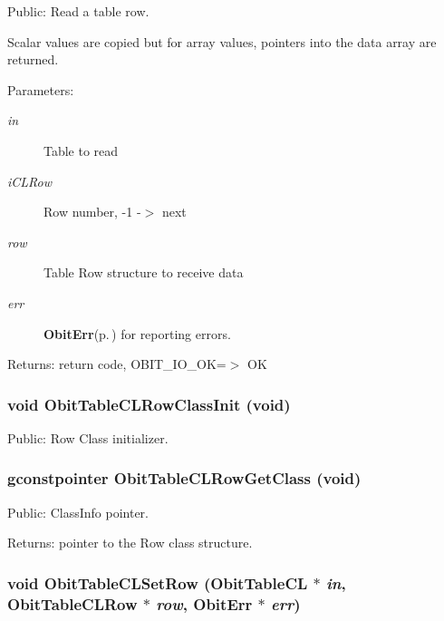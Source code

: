 Public: Read a table row. 

Scalar values are copied but for array values, pointers into the data array are returned. \begin{Desc}
\item[Parameters:]
\begin{description}
\item[{\em in}]Table to read \item[{\em i\-CLRow}]Row number, -1 -$>$ next \item[{\em row}]Table Row structure to receive data \item[{\em err}]{\bf Obit\-Err}{\rm (p.\,\pageref{structObitErr})} for reporting errors. \end{description}
\end{Desc}
\begin{Desc}
\item[Returns:]return code, OBIT\_\-IO\_\-OK=$>$ OK \end{Desc}
\subsubsection{\setlength{\rightskip}{0pt plus 5cm}void Obit\-Table\-CLRow\-Class\-Init (void)}\label{ObitTableCL_8h_a7}


Public: Row Class initializer. 

\subsubsection{\setlength{\rightskip}{0pt plus 5cm}gconstpointer Obit\-Table\-CLRow\-Get\-Class (void)}\label{ObitTableCL_8h_a9}


Public: Class\-Info pointer. 

\begin{Desc}
\item[Returns:]pointer to the Row class structure. \end{Desc}
\subsubsection{\setlength{\rightskip}{0pt plus 5cm}void Obit\-Table\-CLSet\-Row ({\bf Obit\-Table\-CL} $\ast$ {\em in}, {\bf Obit\-Table\-CLRow} $\ast$ {\em row}, {\bf Obit\-Err} $\ast$ {\em err})}\label{ObitTableCL_8h_a19}


